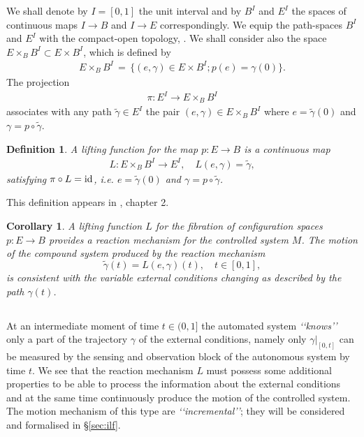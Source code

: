 \documentclass[11pt]{amsart}
\newtheorem{corollary}[theorem]{Corollary}
\newtheorem{definition}[theorem]{Definition}
\begin{document}
We shall denote by $I=[0,1]$ the unit interval and by $B^I$ and $E^I$ the spaces of continuous maps $I\to B$ and $I\to E$ correspondingly. We equip the path-spaces $B^I$ and $E^I$ with the compact-open topology, \cite{Sp}. We shall consider also the space $E\times_B B^I\subset E\times B^I$, which is defined by
\begin{eqnarray}\label{bbe}
E\times_B B^I\, =\, \{(e, \gamma)\in E\times B^I; p(e)=\gamma(0)\}.
\end{eqnarray} 
The projection 
\begin{eqnarray}
\pi: E^I\to E\times_B B^I
\end{eqnarray}
associates with any path $\tilde \gamma\in E^I$ the pair $(e, \gamma)\in E\times_B B^I$ where $e=\tilde \gamma(0)$ and $\gamma=p\circ \tilde\gamma$. 

\begin{definition} \label{liftingf}
A lifting function for the map $p:E\to B$ is a continuous map 
\begin{eqnarray}\label{eq:9a}
L: E\times_B B^I\to E^I, \quad L(e, \gamma)=\tilde\gamma,
\end{eqnarray} 
satisfying $\pi\circ L={\rm id}$, i.e. $e=\tilde \gamma(0)$ and $\gamma=p\circ \tilde\gamma$. 
\end{definition}

This definition appears in \cite{Sp}, chapter 2. 

\begin{corollary}
A lifting function $L$ for the fibration of configuration spaces $p: E\to B$ provides a reaction mechanism for the controlled system $M$. 
The motion of the compound system produced by the reaction mechanism 
$$\tilde \gamma(t) =L(e, \gamma)(t), \quad t\in [0,1],$$ 
is consistent with the variable external conditions changing as described by the path $\gamma(t)$. 
\end{corollary}

\subsection{} At an intermediate moment of time $t\in (0,1]$ the automated system {\it \lq\lq knows\rq\rq\ } only a part of the trajectory $\gamma$ of the external conditions, 
namely only $\gamma|_{[0,t]}$ can be measured by the sensing and observation block of the autonomous system by time $t$. We see that the reaction mechanism $L$ must possess 
some additional properties to be able to process the information about the external conditions and at the same time continuously produce the motion of the controlled system. The motion mechanism of this type are {\it \lq\lq incremental\rq\rq}; they will be considered and formalised in \S \ref{sec:ilf}. 
\end{document}
